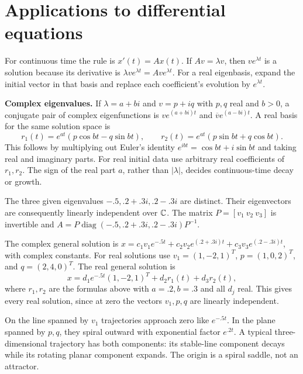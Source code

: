 \section{Applications to differential equations}
For continuous time the rule is $x'(t)=Ax(t)$. If $Av=\lambda v$,
then $v e^{\lambda t}$ is a solution because its derivative is
$\lambda v e^{\lambda t}=Av e^{\lambda t}$. For a real eigenbasis,
expand the initial vector in that basis and replace each coefficient's
evolution by $e^{\lambda t}$.

\textbf{Complex eigenvalues.} If $\lambda=a+bi$ and $v=p+iq$ with
$p,q$ real and $b>0$, a conjugate pair of complex eigenfunctions is
$ve^{(a+bi)t}$ and $\overline v e^{(a-bi)t}$. A real basis for the same
solution space is
\[r_1(t)=e^{at}(p\cos bt-q\sin bt),\qquad
r_2(t)=e^{at}(p\sin bt+q\cos bt).\]
This follows by multiplying out Euler's identity
$e^{ibt}=\cos bt+i\sin bt$ and taking real and imaginary parts.
For real initial data use arbitrary real coefficients of $r_1,r_2$.
The sign of the real part $a$, rather than $|\lambda|$, decides
continuous-time decay or growth.

The three given eigenvalues $-.5,.2+.3i,.2-.3i$ are distinct.
Their eigenvectors are consequently linearly independent over $\mathbb{C}$.
The matrix $P=[v_1\ v_2\ v_3]$ is invertible and
$A=P\operatorname{diag}(-.5,.2+.3i,.2-.3i)P^{-1}$.

The complex general solution is
$x=c_1v_1e^{-.5t}+c_2v_2e^{(.2+.3i)t}+c_3v_3e^{(.2-.3i)t}$,
with complex constants. For real solutions use $v_1=(1,-2,1)^T$,
$p=(1,0,2)^T$, and $q=(2,4,0)^T$. The real general solution is
\[x=d_1 e^{-.5t}(1,-2,1)^T+d_2r_1(t)+d_3r_2(t),\]
where $r_1,r_2$ are the formulas above with $a=.2,b=.3$ and all
$d_j$ real. This gives every real solution, since at zero the vectors
$v_1,p,q$ are linearly independent.

On the line spanned by $v_1$ trajectories approach zero like $e^{-.5t}$.
In the plane spanned by $p,q$, they spiral outward with exponential
factor $e^{.2t}$. A typical three-dimensional trajectory has both
components: its stable-line component decays while its rotating planar
component expands. The origin is a spiral saddle, not an attractor.

